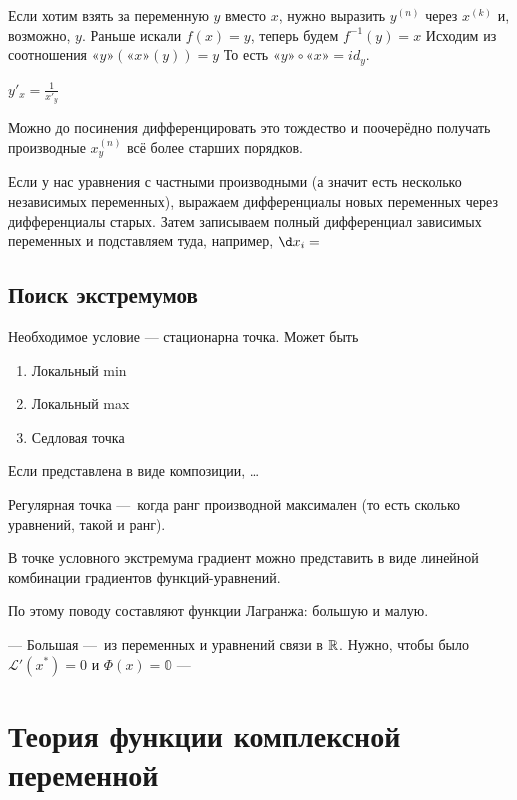 \documentclass[12pt, a4paper]{article}
\begin{document}
Если хотим взять за переменную $y$ вместо $x$, нужно выразить $y^{(n)}$ через $x^{(k)}$ и, возможно, $y$.
Раньше искали $f(x) = y$, теперь будем $f^{-1}(y) = x$
Исходим из соотношения $«y»(«x»(y)) = y$
То есть $«y» \circ «x» = id_y$.

$y'_x = \frac{1}{x'_y}$

Можно до посинения дифференцировать это тождество 
и поочерёдно получать производные $x^{(n)}_y$ всё более старших порядков.

Если у нас уравнения с частными производными (а значит есть несколько независимых переменных),
выражаем дифференциалы новых переменных через дифференциалы старых. 
Затем записываем полный дифференциал зависимых переменных и подставляем туда, например, $\d x_i = $

\subsection{Поиск экстремумов}

Необходимое условие — стационарна точка.
Может быть

\begin{enumerate}
  \item Локальный min
  \item Локальный max
  \item Седловая точка
\end{enumerate}

Если представлена в виде композиции, …

Регулярная точка — когда ранг производной максимален (то есть сколько уравнений, такой и ранг).

В точке условного экстремума градиент можно представить 
в виде линейной комбинации градиентов функций-уравнений.

По этому поводу составляют функции Лагранжа: большую и малую.

— Большая — из переменных и уравнений связи в ${\mathbb{R}}$. Нужно, чтобы было $\mathcal{L}'(x^*) = 0$ и $\Phi(x) = \mathbb{0}$
— 


\section{Теория функции комплексной переменной}
\end{document}
